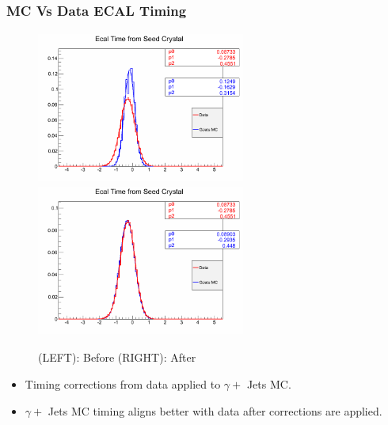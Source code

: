\documentclass{beamer}
\begin{document}
\begin{frame}
\frametitle{MC Vs Data ECAL Timing}
  \begin{minipage}[b]{0.7\paperwidth}
    \begin{figure}[htbp]
    \mbox{\includegraphics[height=5.0cm,width=0.61\textwidth]            {THESISPLOTS/SeedTime_data-mc.png}
          \includegraphics[height=5.0cm,width=0.61\textwidth]            {THESISPLOTS/SeedTime_data-mc_Calib.png}}
    \caption{\alert{(LEFT)}: Before \alert{(RIGHT)}: After}
   \end{figure} 
 \end{minipage}
 
 \begin{minipage}[b]{0.8\paperwidth}
  \begin{itemize}
     \item Timing corrections from data applied to $\gamma +$ Jets MC.
     \item $\gamma +$ Jets MC timing aligns better with data after corrections are applied.
  \end{itemize}
\end{minipage}
\end{frame}
\end{document}
